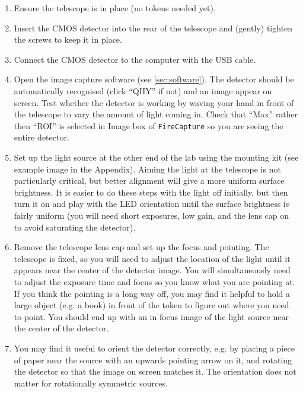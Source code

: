 \documentclass[11pt]{article}
\begin{document}
\begin{enumerate}
    \item Ensure the telescope is in place (no tokens needed yet).
    \item Insert the CMOS detector into the rear of the telescope and (gently) tighten the screws to keep it in place.
    \item Connect the CMOS detector to the computer with the USB cable.
    \item Open the image capture software (see \ref{sec:software}). The detector should be automatically recognised (click ``QHY'' if not) and an image appear on screen. Test whether the detector is working by waving your hand in front of the telescope to vary the amount of light coming in. Check that ``Max'' rather then ``ROI'' is selected in Image box of \texttt{FireCapture} so you are seeing the entire detector.
    \item Set up the light source at the other end of the lab using the mounting kit (see example image in the Appendix). Aiming the light at the telescope is not particularly critical, but better alignment will give a more uniform surface brightness. It is easier to do these steps with the light off initially, but then turn it on and play with the LED orientation until the surface brightness is fairly uniform (you will need short exposures, low gain, and the lens cap on to avoid saturating the detector).
    \item Remove the telescope lens cap and set up the focus and pointing. The telescope is fixed, so you will need to adjust the location of the light until it appears near the center of the detector image. You will simultaneously need to adjust the exposure time and focus so you know what you are pointing at. If you think the pointing is a long way off, you may find it helpful to hold a large object (e.g. a book) in front of the token to figure out where you need to point. You should end up with an in focus image of the light source near the center of the detector.
    \item You may find it useful to orient the detector correctly, e.g. by placing a piece of paper near the source with an upwards pointing arrow on it, and rotating the detector so that the image on screen matches it. The orientation does not matter for rotationally symmetric sources.

\end{enumerate}
\end{document}
